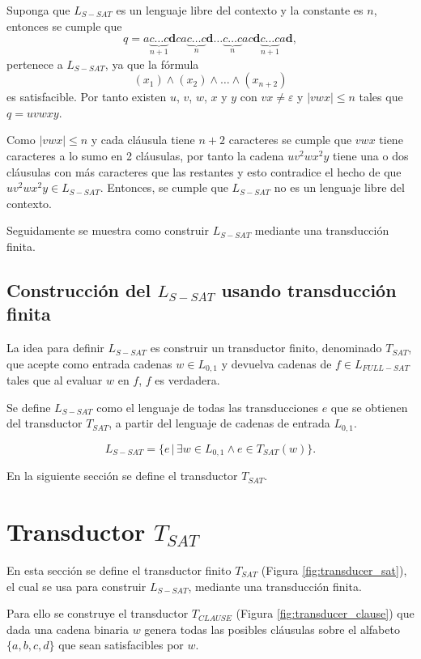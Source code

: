 \documentclass[12pt]{article}
\begin{document}
Suponga que $L_{S-SAT}$ es un lenguaje libre del contexto y la constante es $n$, entonces se cumple que 
$$q=a\underbrace{c\ldots c}_{n+1}\mathbf{d}ca\underbrace{c\ldots c}_{n}\mathbf{d}\ldots \underbrace{c\ldots c}_{n}ac\mathbf{d}\underbrace{c\ldots c}_{n+1}a\mathbf{d},$$
pertenece a $L_{S-SAT}$, ya que la fórmula 
$$(x_1)\wedge(x_2)\wedge\ldots\wedge(x_{n+2})$$ es satisfacible. Por tanto existen $u$, $v$, $w$, $x$ y $y$ con $vx\neq \varepsilon$ y $|vwx|\leq n$
tales que $q=uvwxy$. 

Como $|vwx|\leq n$ y cada cláusula tiene $n+2$ caracteres se cumple que $vwx$ tiene caracteres a lo sumo en 2 cláusulas,
por tanto la cadena $uv^2wx^2y$ tiene una o dos cláusulas con más caracteres que las restantes y esto contradice el hecho 
de que $uv^2wx^2y\in L_{S-SAT}$. Entonces, se cumple que $L_{S-SAT}$ no es un lenguaje libre del contexto.

Seguidamente se muestra como construir $L_{S-SAT}$ mediante una transducción finita.

\subsection{Construcción del $L_{S-SAT}$ usando transducción finita}

La idea para definir $L_{S-SAT}$ es construir un transductor finito, denominado $T_{SAT}$, que acepte como 
entrada cadenas $w\in L_{0,1}$ y devuelva cadenas de $f\in L_{FULL-SAT}$ tales que al evaluar $w$ en $f$, $f$
es verdadera. 

Se define $L_{S-SAT}$ como el lenguaje de todas las transducciones $e$ que se obtienen del transductor 
$T_{SAT}$, a partir del lenguaje de cadenas de entrada $L_{0,1}$. 

$$L_{S-SAT} = \{e\,|\,\exists w \in L_{0,1} \wedge e \in T_{SAT}(w) \}.$$

En la siguiente sección se define el transductor $T_{SAT}$.

\section{Transductor $T_{SAT}$}
\label{sec:tsat}

En esta sección se define el transductor finito $T_{SAT}$ (Figura \ref{fig:transducer_sat}), el cual se usa para construir $L_{S-SAT}$, mediante 
una transducción finita.

Para ello se construye el transductor $T_{CLAUSE}$ (Figura \ref{fig:transducer_clause}) que dada una cadena binaria $w$
genera todas las posibles cláusulas sobre el alfabeto $\{a,b,c,d\}$ que sean satisfacibles por $w$. 
\end{document}
